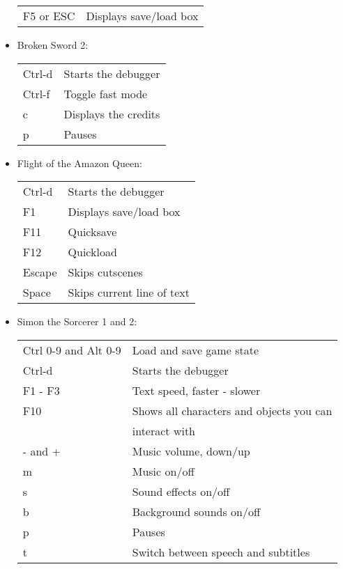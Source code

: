 \begin{itemize}
\begin{tabular}{ll}
    F5 or ESC              & Displays save/load box\\
  \end{tabular}
\item Broken Sword 2:\\
  \begin{tabular}{ll}
    Ctrl-d                 & Starts the debugger\\
    Ctrl-f                 & Toggle fast mode\\
    c                      & Displays the credits\\
    p                      & Pauses\\
  \end{tabular}
\item Flight of the Amazon Queen:\\
  \begin{tabular}{ll}
    Ctrl-d                 & Starts the debugger\\
    F1                     & Displays save/load box\\
    F11                    & Quicksave\\
    F12                    & Quickload\\
    Escape                 & Skips cutscenes\\
    Space                  & Skips current line of text\\
  \end{tabular}
\item Simon the Sorcerer 1 and 2:\\
  \begin{tabular}{ll}
    Ctrl 0-9 and Alt 0-9   & Load and save game state\\
    Ctrl-d                 & Starts the debugger\\
    F1 - F3                & Text speed, faster - slower\\
    F10                    & Shows all characters and objects you can \\
                           & interact with\\
    - and +                & Music volume, down/up\\
    m                      & Music on/off\\
    s                      & Sound effects on/off\\
    b                      & Background sounds on/off\\
    p                      & Pauses\\
    t                      & Switch between speech and subtitles\\

\end{tabular}
\end{itemize}
